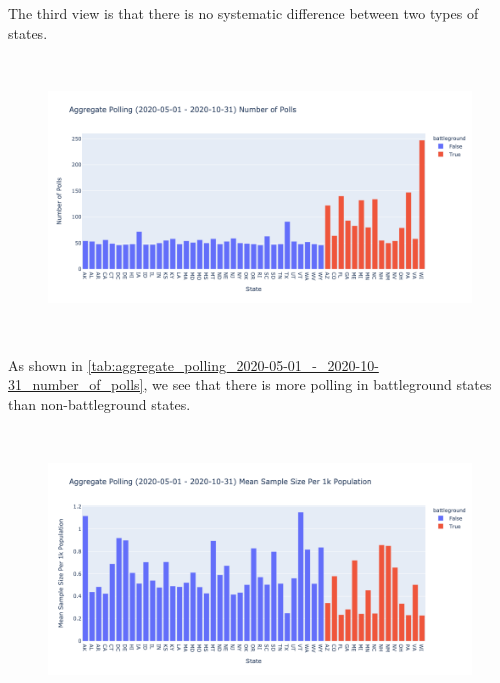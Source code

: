 The third view is that there is no systematic difference between two types of states.


\begin{figure}[H]
    \centering
    \includegraphics[height=20em]{figures/aggregate_polling_2020-05-01_-_2020-10-31_number_of_polls.png}
    \caption{}
    \label{fig:aggregate_polling_2020-05-01_-_2020-10-31_number_of_polls}
\end{figure}

\begin{table}[H]

    \label{tab:aggregate_polling_2020-05-01_-_2020-10-31_number_of_polls}
\end{table}

As shown in \ref{tab:aggregate_polling_2020-05-01_-_2020-10-31_number_of_polls}, we see that there is more polling in battleground states than non-battleground states.\\

\begin{figure}[H]
    \centering
    \includegraphics[height=20em]{figures/aggregate_polling_2020-05-01_-_2020-10-31_mean_sample_size_per_1k_population.png}
    \caption{}
    \label{fig:aggregate_polling_2020-05-01_-_2020-10-31_mean_sample_size_per_1k_population}
\end{figure}

\begin{table}[H]

    \label{tab:aggregate_polling_2020-05-01_-_2020-10-31_mean_sample_size_per_1k_population}
\end{table}

